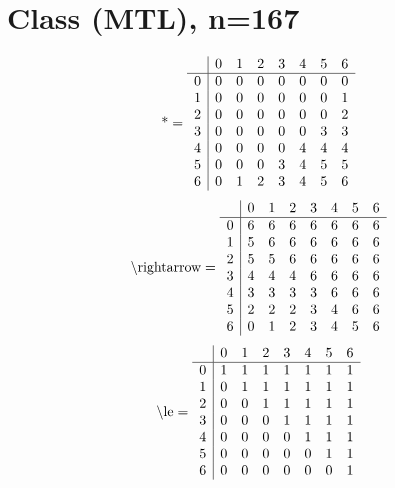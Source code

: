\documentclass[11pt]{article}
\begin{document}
\section{Class (MTL), n=167}
\[\text{*} = 
\begin{array}{r | r r r r r r r}
 & 0 & 1 & 2 & 3 & 4 & 5 & 6 \\ \hline
0 & 0 & 0 & 0 & 0 & 0 & 0 & 0 \\
1 & 0 & 0 & 0 & 0 & 0 & 0 & 1 \\
2 & 0 & 0 & 0 & 0 & 0 & 0 & 2 \\
3 & 0 & 0 & 0 & 0 & 0 & 3 & 3 \\
4 & 0 & 0 & 0 & 0 & 4 & 4 & 4 \\
5 & 0 & 0 & 0 & 3 & 4 & 5 & 5 \\
6 & 0 & 1 & 2 & 3 & 4 & 5 & 6 \\
\end{array}
\]
\[\text{\textbackslash rightarrow} = 
\begin{array}{r | r r r r r r r}
 & 0 & 1 & 2 & 3 & 4 & 5 & 6 \\ \hline
0 & 6 & 6 & 6 & 6 & 6 & 6 & 6 \\
1 & 5 & 6 & 6 & 6 & 6 & 6 & 6 \\
2 & 5 & 5 & 6 & 6 & 6 & 6 & 6 \\
3 & 4 & 4 & 4 & 6 & 6 & 6 & 6 \\
4 & 3 & 3 & 3 & 3 & 6 & 6 & 6 \\
5 & 2 & 2 & 2 & 3 & 4 & 6 & 6 \\
6 & 0 & 1 & 2 & 3 & 4 & 5 & 6 \\
\end{array}
\]
\[\text{\textbackslash le} = 
\begin{array}{r | r r r r r r r}
 & 0 & 1 & 2 & 3 & 4 & 5 & 6 \\ \hline
0 & 1 & 1 & 1 & 1 & 1 & 1 & 1 \\
1 & 0 & 1 & 1 & 1 & 1 & 1 & 1 \\
2 & 0 & 0 & 1 & 1 & 1 & 1 & 1 \\
3 & 0 & 0 & 0 & 1 & 1 & 1 & 1 \\
4 & 0 & 0 & 0 & 0 & 1 & 1 & 1 \\
5 & 0 & 0 & 0 & 0 & 0 & 1 & 1 \\
6 & 0 & 0 & 0 & 0 & 0 & 0 & 1 \\
\end{array}
\]
\end{document}
